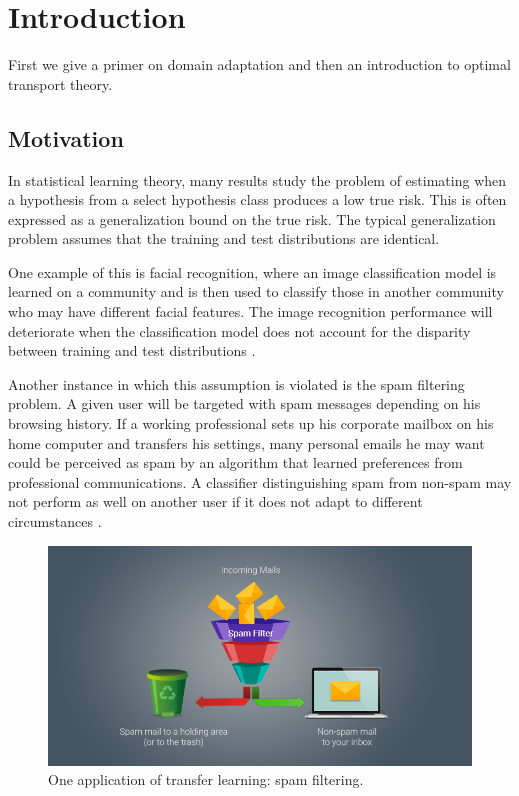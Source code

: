 \chapter{Introduction}
First we give a primer on domain adaptation and then an introduction to optimal transport theory.

\section{Motivation}

In statistical learning theory, many results study the problem of estimating when a hypothesis from a select hypothesis class produces a low true risk. This is often expressed as a generalization bound on the true risk. The typical generalization problem assumes that the training and test distributions are identical. 

One example of this is facial recognition, where an image classification model is learned on a community and is then used to classify those in another community who may have different facial features. The image recognition performance will deteriorate when the classification model does not account for the disparity between training and test distributions \cite{Redko2017}.

Another instance in which this assumption is violated is the spam filtering problem. A given user will be targeted with spam messages depending on his browsing history. If a working professional sets up his corporate mailbox on his home computer and transfers his settings, many personal emails he may want could be perceived as spam by an algorithm that learned preferences from professional communications. A classifier distinguishing spam from non-spam may not perform as well on another user if it does not adapt to different circumstances \cite{Redko2017}.

\begin{figure}
	\centering
	\includegraphics[width=0.7\linewidth]{pictures/anti-spam-filtering-techniques.png}
	\caption{One application of transfer learning: spam filtering.}
	\label{fig:datree}
\end{figure}

